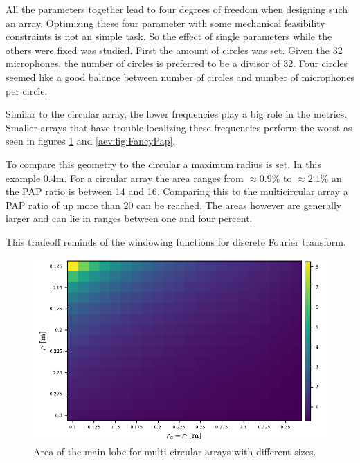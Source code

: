 All the parameters together lead to four degrees of freedom when designing such an array.
Optimizing these four parameter with some mechanical feasibility constraints is not an simple task.
So the effect of single parameters while the others were fixed was studied.
First the amount of circles was set.
Given the 32 microphones, the number of circles is preferred to be a divisor of 32.
Four circles seemed like a good balance between number of circles and number of microphones
per circle.

Similar to the circular array, the lower frequencies play a big role in the metrics.
Smaller arrays that have trouble localizing these frequencies perform the worst as seen
in figures \ref{aev:fig:FancyArea} and \ref{aev:fig:FancyPap}.

To compare this geometry to the circular a maximum radius is set.
In this example 0.4m.
For a circular array the area ranges from $\approx 0.9\%$ to
$\approx 2.1\%$ an the PAP ratio is between 14 and 16.
Comparing this to the multicircular array a PAP ratio of up
more than 20 can be reached.
The areas however are generally larger and can lie in ranges
between one and four percent.

This tradeoff reminds of the windowing functions for discrete
Fourier transform.
\begin{figure}[h]
	\centering
	\includegraphics[]{images/5_array_evaluation/fancy_area.pdf}
	\caption{Area of the main lobe for multi circular arrays with different
		sizes.}
	\label{aev:fig:FancyArea}
\end{figure}

